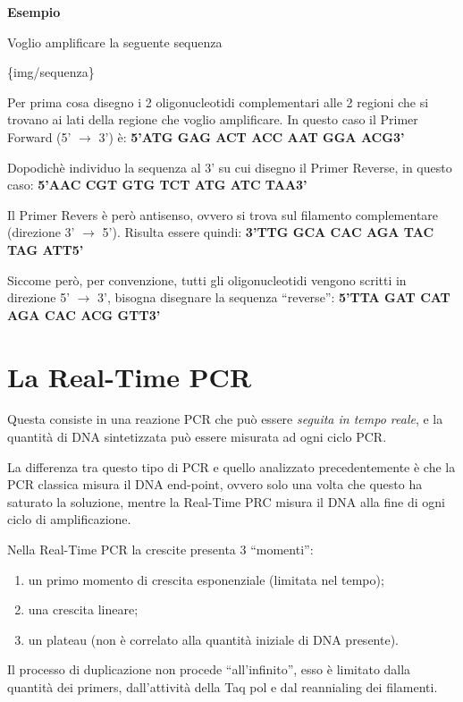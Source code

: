 \documentclass[11pt]{book}
\begin{document}
\textbf{Esempio}

Voglio amplificare la seguente sequenza

\{img/sequenza\}

Per prima cosa disegno i 2 oligonucleotidi complementari alle 2 regioni
che si trovano ai lati della regione che voglio amplificare. In questo
caso il Primer Forward (5' \(\rightarrow\) 3') è: \textbf{5'ATG GAG ACT
ACC AAT GGA ACG3'}

Dopodichè individuo la sequenza al 3' su cui disegno il Primer Reverse,
in questo caso: \textbf{5'AAC CGT GTG TCT ATG ATC TAA3'}

Il Primer Revers è però antisenso, ovvero si trova sul filamento
complementare (direzione 3' \(\rightarrow\) 5'). Risulta essere quindi:
\textbf{3'TTG GCA CAC AGA TAC TAG ATT5'}

Siccome però, per convenzione, tutti gli oligonucleotidi vengono scritti
in direzione 5' \(\rightarrow\) 3', bisogna disegnare la sequenza
``reverse'': \textbf{5'TTA GAT CAT AGA CAC ACG GTT3'}

\section{La Real-Time PCR}\label{la-real-time-pcr}

Questa consiste in una reazione PCR che può essere \emph{seguita in
tempo reale}, e la quantità di DNA sintetizzata può essere misurata ad
ogni ciclo PCR.

La differenza tra questo tipo di PCR e quello analizzato precedentemente
è che la PCR classica misura il DNA end-point, ovvero solo una volta che
questo ha saturato la soluzione, mentre la Real-Time PRC misura il DNA
alla fine di ogni ciclo di amplificazione.

Nella Real-Time PCR la crescite presenta 3 ``momenti'':

\begin{enumerate}
\def\labelenumi{\arabic{enumi}.}
\itemsep1pt\parskip0pt
\item
  un primo momento di crescita esponenziale (limitata nel tempo);
\item
  una crescita lineare;
\item
  un plateau (non è correlato alla quantità iniziale di DNA presente).
\end{enumerate}

Il processo di duplicazione non procede ``all'infinito'', esso è
limitato dalla quantità dei primers, dall'attività della Taq pol e dal
reannialing dei filamenti.
\end{document}
